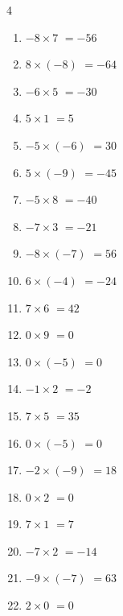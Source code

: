 \begin{multicols}{4}
\begin{enumerate}
  \item $-8\times 7$
        $=-56$

  \item $8\times (-8)$
        $=-64$

  \item $-6\times 5$
        $=-30$

  \item $5\times 1$
        $=5$

  \item $-5\times (-6)$
        $=30$

  \item $5\times (-9)$
        $=-45$

  \item $-5\times 8$
        $=-40$

  \item $-7\times 3$
        $=-21$

  \item $-8\times (-7)$
        $=56$

  \item $6\times (-4)$
        $=-24$

  \item $7\times 6$
        $=42$

  \item $0\times 9$
        $=0$

  \item $0\times (-5)$
        $=0$

  \item $-1\times 2$
        $=-2$

  \item $7\times 5$
        $=35$

  \item $0\times (-5)$
        $=0$

  \item $-2\times (-9)$
        $=18$

  \item $0\times 2$
        $=0$

  \item $7\times 1$
        $=7$

  \item $-7\times 2$
        $=-14$

  \item $-9\times (-7)$
        $=63$

\columnbreak %

  \item $2\times 0$
        $=0$


\end{enumerate}
\end{multicols}
